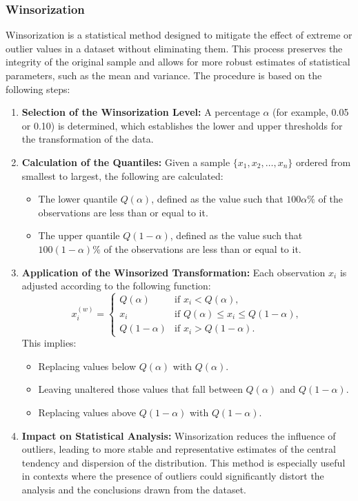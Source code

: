 \documentclass[10pt]{article}
\begin{document}
\subsubsection{Winsorization}

Winsorization is a statistical method designed to mitigate the effect of extreme or outlier values in a dataset without eliminating them. This process preserves the integrity of the original sample and allows for more robust estimates of statistical parameters, such as the mean and variance. The procedure is based on the following steps:

\begin{enumerate}
    \item \textbf{Selection of the Winsorization Level:}  
    A percentage \( \alpha \) (for example, 0.05 or 0.10) is determined, which establishes the lower and upper thresholds for the transformation of the data.

    \item \textbf{Calculation of the Quantiles:}  
    Given a sample \( \{x_1, x_2, \dots, x_n\} \) ordered from smallest to largest, the following are calculated:
    \begin{itemize}
        \item The lower quantile \( Q(\alpha) \), defined as the value such that \( 100\alpha\% \) of the observations are less than or equal to it.
        \item The upper quantile \( Q(1-\alpha) \), defined as the value such that \( 100(1-\alpha)\% \) of the observations are less than or equal to it.
    \end{itemize}

    \item \textbf{Application of the Winsorized Transformation:}  
    Each observation \( x_i \) is adjusted according to the following function:
    \[
    x_i^{(w)} = \begin{cases} 
    Q(\alpha) & \text{if } x_i < Q(\alpha), \\
    x_i & \text{if } Q(\alpha) \leq x_i \leq Q(1-\alpha), \\
    Q(1-\alpha) & \text{if } x_i > Q(1-\alpha).
    \end{cases}
    \]
    This implies:
    \begin{itemize}
        \item Replacing values below \( Q(\alpha) \) with \( Q(\alpha) \).
        \item Leaving unaltered those values that fall between \( Q(\alpha) \) and \( Q(1-\alpha) \).
        \item Replacing values above \( Q(1-\alpha) \) with \( Q(1-\alpha) \).
    \end{itemize}

    \item \textbf{Impact on Statistical Analysis:}  
    Winsorization reduces the influence of outliers, leading to more stable and representative estimates of the central tendency and dispersion of the distribution. This method is especially useful in contexts where the presence of outliers could significantly distort the analysis and the conclusions drawn from the dataset.
\end{enumerate}
\end{document}
